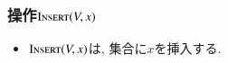 \documentclass[main]{subfiles}
\begin{document}
\begin{frame}\frametitle{操作$\mathrm{\text{I\textsc{nsert}}}(V,x)$}
\begin{itemize}
	\item $\mathrm{\text{I\textsc{nsert}}}(V,x)$は, 集合に$x$を挿入する.\\
\end{itemize}

\begin{columns}[c]
	\begin{column}{0.5\linewidth}
		
	\end{column}
	\begin{column}{0.49\linewidth}
		
	\end{column}
\end{columns}
\end{frame}
\end{document}

